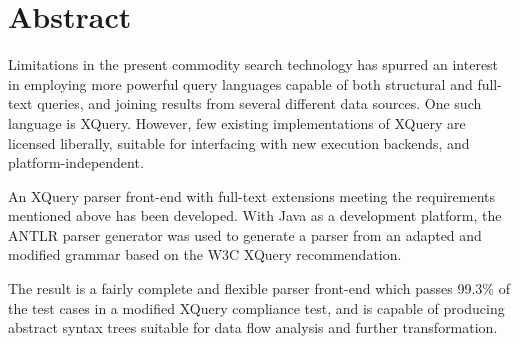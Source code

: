 \chapter*{Abstract}
Limitations in the present commodity search technology has spurred
an interest in employing more powerful query languages capable of both
structural and full-text queries, and joining results from several different data
sources. One such language is XQuery. However, few existing implementations of
XQuery are licensed liberally, suitable for interfacing with new execution
backends, and platform-independent. 

An XQuery parser front-end with full-text extensions meeting the requirements
mentioned above has been developed. With Java as a development platform, the
ANTLR parser generator was used to generate a parser from an adapted and
modified grammar based on the W3C XQuery recommendation. 

The result is a fairly complete and flexible parser front-end which passes
99.3\% of the test cases in a modified XQuery compliance test, and is capable of
producing abstract syntax trees suitable for data flow analysis and further 
transformation.
